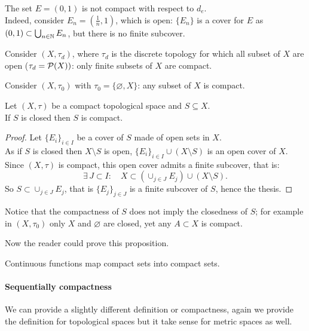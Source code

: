 \begin{exam}
	The set $E=(0,1)$ is not compact with respect to $d_e$.\\
	Indeed, consider $E_n = (\frac 1 n, 1)$, which is open: $\{E_n\}$ is a cover for $E$ as $(0,1) \subset \bigcup_{n\in \mathbb N} E_n$, but there is no finite subcover.
\end{exam}
\begin{exam}	
	Consider $(X, \tau_d)$, where $\tau_d$ is the discrete topology for which all subset of $X$ are open ($\tau_d = \mathcal P(X))$: only finite subsets of $X$ are compact.
\end{exam}
\begin{exam}	
	Consider $(X, \tau_0)$ with $\tau_0 = \{\varnothing, X\}$: any subset of $X$ is compact.
\end{exam}

\begin{prop}
    Let $(X, \tau)$ be a compact topological space and $S \subseteq X$.\\
    If $S$ is closed then $S$ is compact.
\end{prop}
\begin{proof}
    Let $\{E_i\}_{i\in I}$ be a cover of $S$ made of open sets in $X$.\\
    As if $S$ is closed then $X\setminus S$ is open,
    $\{E_i\}_{i\in I} \cup (X \setminus S)$ is an open cover of $X$.\\
	Since $(X, \tau)$ is compact, this open cover admits a finite subcover, that is:
	$$\exists \, J \subset I : \quad X \subset (\cup_{j \in J} E_j) \cup (X \setminus S).$$
	So $S \subset \cup_{j \in J} E_j$, that is $\{E_j\}_{j \in J}$ is a finite subcover of $S$, hence the thesis.
\end{proof}

Notice that the compactness of $S$ does not imply the closedness of $S$; for example in $(X, \tau_0)$ only $X$ and $\varnothing$ are closed, yet any $A\subset X$ is compact. 

Now the reader could prove this proposition.
\begin{prop}
	Continuous functions map compact sets into compact sets.
\end{prop}
    
\paragraph{Sequentially compactness} We can provide a slightly different definition or compactness, again we provide the definition for topological spaces but it take sense for metric spaces as well.
    
